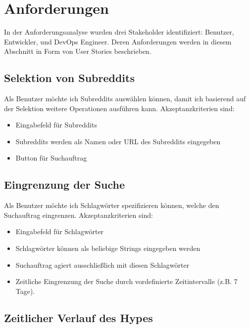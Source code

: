 \documentclass[a4paper, 10pt, conference]{ieeeconf}
\begin{document}
\section{Anforderungen} \label{s:anforderungen}

In der Anforderungsanalyse wurden drei Stakeholder identifiziert: Benutzer, Entwickler, und DevOps Engineer.  Deren Anforderungen werden in diesem Abschnitt in Form von User Stories beschrieben.

\subsection{Selektion von Subreddits}

Als Benutzer möchte ich Subreddits auswählen können, damit ich basierend auf der Selektion weitere Operationen ausführen kann. Akzeptanzkriterien sind:
\begin{itemize}
\item Eingabefeld für Subreddits
\item Subreddits werden als Namen oder URL des Subreddits eingegeben
\item Button für Suchauftrag
\end{itemize}

\subsection{Eingrenzung der Suche}

Als Benutzer möchte ich Schlagwörter spezifizieren können, welche den Suchauftrag eingrenzen. Akzeptanzkriterien sind:
\begin{itemize}
\item Eingabefeld für Schlagwörter
\item Schlagwörter können als beliebige Strings eingegeben werden
\item Suchauftrag agiert ausschließlich mit diesen Schlagwörter
\item Zeitliche Eingrenzung der Suche durch vordefinierte Zeitintervalle (z.B. 7 Tage).
\end{itemize}

\subsection{Zeitlicher Verlauf des Hypes}
\end{document}
